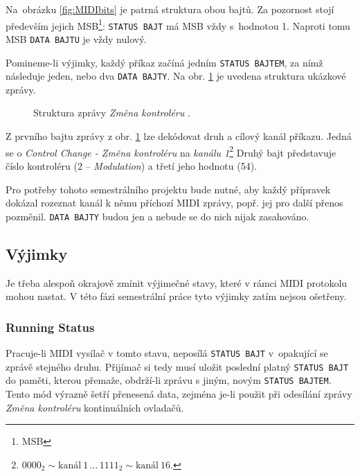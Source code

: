 Na~obrázku \ref{fig:MIDIbits} je patrná struktura obou bajtů. Za pozornost stojí především jejich \acs{MSB}\footnote{\acl{MSB}}: \texttt{STATUS~BAJT} má \acs{MSB} vždy s~hodnotou 1. Naproti tomu \acs{MSB} \texttt{DATA BAJTU} je vždy nulový.

Pomineme-li výjimky, každý příkaz začíná jedním \texttt{STATUS BAJTEM}, za nímž následuje jeden, nebo dva \texttt{DATA BAJTY}. Na obr. \ref{fig:MIDImsg} je uvedena struktura ukázkové zprávy.

\begin{figure}[h]
    \centering
    \caption{Struktura zprávy \emph{Změna kontroléru} \cite{MIDIspecs}.}
    \label{fig:MIDImsg}
\end{figure}

Z prvního bajtu zprávy z obr. \ref{fig:MIDImsg} lze dekódovat druh a cílový kanál příkazu. Jedná se o \emph{Control Change - Změna kontroléru} na \emph{kanálu 1}\footnote{$0000_2 \sim \mathrm{kanál\ 1}\,\ldots\,1111_2\sim\mathrm{kanál\ 16}$.} Druhý bajt představuje číslo kontroléru (2 -- \emph{Modulation}) a třetí jeho hodnotu (54).

Pro potřeby tohoto semestrálního projektu bude nutné, aby každý přípravek dokázal rozeznat kanál k němu příchozí \acs{MIDI} zprávy, popř. jej pro další přenos pozměnil. \texttt{DATA~BAJTY} budou jen  a nebude se do nich nijak zasahováno.

\subsection{Výjimky}
Je třeba alespoň okrajově zmínit výjimečné stavy, které v rámci \acs{MIDI} protokolu mohou nastat. V této fázi semestrální práce tyto výjimky zatím nejsou ošetřeny.

\subsubsection{Running Status}
Pracuje-li \acs{MIDI} vysílač v tomto stavu, neposílá \texttt{STATUS BAJT} v~opakující se zprávě stejného druhu. Přijímač si tedy musí uložit poslední platný \texttt{STATUS BAJT} do paměti, kterou přemaže, obdrží-li zprávu s jiným, novým \texttt{STATUS BAJTEM}. Tento mód výrazně šetří přenesená data, zejména je-li použit při odesílání zprávy \emph{Změna kontroléru} kontinuálních ovladačů. \cite{MIDIspecs}

